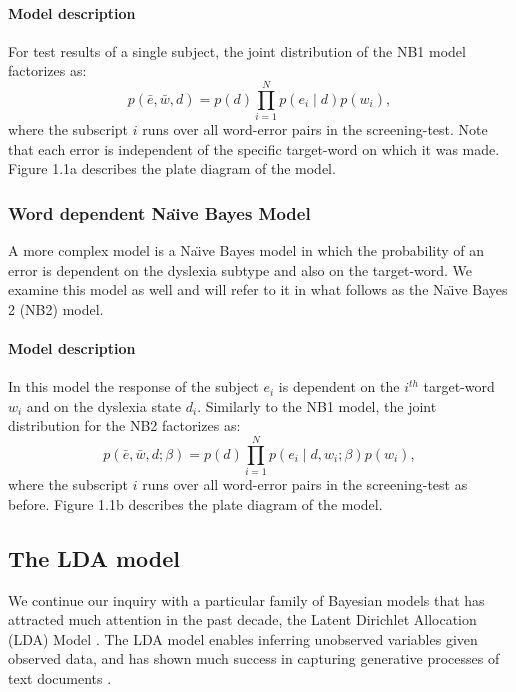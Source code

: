 \paragraph{Model description}
For test results of a single subject, the joint distribution of the NB1 model factorizes as:
\[ p(\bar{e}, \bar{w}, d) = p(d) \prod_{i=1}^N p(e_i \mid d) p(w_i), \]
where the subscript $ i $ runs over all word-error pairs in the screening-test. Note that each error is independent of the specific target-word on which it was made. Figure 1.1a describes the plate diagram of the model.

\subsubsection{Word dependent Na\"{\i}ve Bayes Model}
A more complex model is a Na\"{\i}ve Bayes model in which the probability of an error is dependent on the dyslexia subtype and also on the target-word. We examine this model as well and will refer to it in what follows as the Na\"{\i}ve Bayes 2 (NB2) model.

\vfill

\paragraph{Model description}
In this model the response of the subject $ e_i $ is dependent on the $ i^{th} $ target-word $ w_i $ and on the dyslexia state $ d_i $. Similarly to the NB1 model, the joint distribution for the NB2 factorizes as:
\[ p(\bar{e}, \bar{w}, d ; \beta) = p(d) \prod_{i=1}^N p(e_i \mid d, w_i ; \beta) p(w_i), \]
where the subscript $i$ runs over all word-error pairs in the screening-test as before. Figure 1.1b describes the plate diagram of the model.

\subsection{The LDA model}
We continue our inquiry with a particular family of Bayesian models that has attracted much attention in the past decade, the Latent Dirichlet Allocation (LDA) Model \citep{bnj03}. The LDA model enables inferring unobserved variables given observed data, and has shown much success in capturing generative processes of text documents \citep{bnj03, rgss04}.

